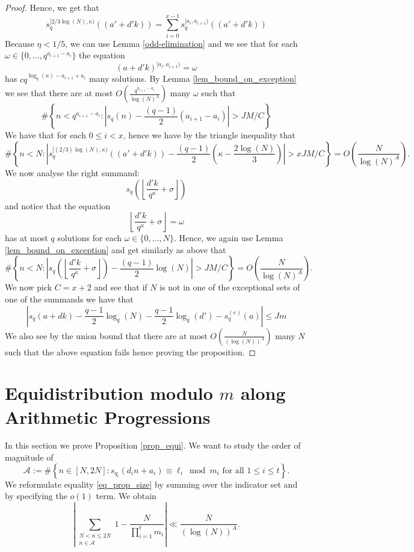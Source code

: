 \documentclass[12pt]{amsart}
\renewcommand{\leq}{\leqslant}
\theoremstyle{definition}
\numberwithin{equation}{section}
\numberwithin{equation}{section}
\begin{document}
\begin{proof}
	Hence, we get that
	\[
		 s_q^{[2/3\log(N),\kappa)}((a'+d'k)) =  \sum_{i=0}^{x-1} s_q^{[a_i,a_{i+1})}((a'+d'k))
	\]
	Because $\eta<1/5$, we can use Lemma \ref{odd-elimination} and we see that for each $\omega\in \{0,\dots, q^{a_{i+1}-a_i}\}$ the equation
	\[
		(a+d'k)^{[a_i,a_{i+1})}=\omega
	\]
	has $cq^{\log_q(n)-a_{i+1}+a_{i}}$ many solutions. By Lemma \ref{lem_bound_on_exception} we see that there are at most $O\left(\frac{q^{a_{i+1}-a_{i}}}{\log(N)^A}\right)$ many $\omega$ such that 
	\[
		\#\left\{n<q^{a_{i+1}-a_{i}}: \left|s_q(n)-\frac{(q-1)}2 (a_{i+1}-a_{i})\right|>JM/C\right\}
	\]
	We have that for each $0\leq i<x$, hence we have by the triangle inequality that
	\[
		\#\left\{n<N: \left|s_q^{[(2/3)\log(N),\kappa)}((a'+d'k))-\frac{(q-1)}2 (\kappa-\frac{2\log(N)}3)\right|>xJM/C\right\}=O\left(\frac{N}{\log(N)^A}\right).
	\]
	We now analyse the right summand:
	\[
		s_q\left(\left\lfloor\frac {d'k}{q^{\kappa}}+\sigma\right\rfloor\right)
	\]
	and notice that the equation
	\[
		\left\lfloor\frac{d'k}{q^{\kappa}}+\sigma\right\rfloor=\omega
	\]
	has at most $q$ solutions for each $\omega\in \{0,\dots, N\} $. Hence, we again use Lemma \ref{lem_bound_on_exception} and get similarly as above that
	\[
		\#\left\{n<N: \left|s_q\left(\left\lfloor\frac {d'k}{q^{\kappa}}+\sigma\right\rfloor\right)-\frac{(q-1)}2 \log(N)\right| >JM/C\right\} = O\left(\frac{N}{\log(N)^A}\right).
	\]
	We now pick $C=x+2$ and see that if $N$ is not in one of the exceptional sets of one of the summands we have that
	\[
		\left|s_q(a+dk)-\frac{q-1}2\log_{q}\left(N\right) - \frac{q-1}2\log_{q}(d')-s_q^{(e)}(a)\right|\leq Jm
	\]
	We also see by the union bound that there are at most $O\left(\frac{N}{(\log(N))^A}\right)$ many $N$ such that the above equation fails hence proving the proposition.
\end{proof}
\section{Equidistribution modulo $m$ along Arithmetic Progressions}\label{sec_uniform}
In this section we prove Proposition \ref{prop_equi}. We want to study the order of magnitude of 
\[
	\mathcal{A}:=\#\left\{ n\in[N,2N]: s_{q_i}(d_in+a_i)\equiv \ell_i\bmod m_i \text{ for all } 1\leq i \leq t
	\right\}.
\]
We reformulate equality \eqref{eq_prop_size} by summing over the indicator set and by specifying the $o(1)$ term. We obtain
\begin{equation}\label{equal_distr}
	\left|\sum_{\substack{N<n\leq 2N\\n\in \mathcal{A}}}1-\frac{N}{\prod_{i=1}^{t}m_i} \right| \ll \frac{N}{(\log(N))^A}.
\end{equation}
\end{document}
